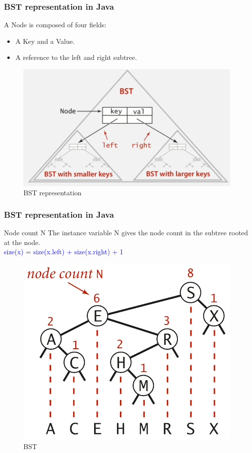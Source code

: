 \documentclass[11pt]{beamer}
\begin{document}
     \begin{frame}
    	\frametitle{BST representation in Java}
        \begin{block}{A Node is composed of four fields:}
        	\begin{itemize}
        		\item A Key and a Value.
        		\item A reference to the left and right subtree.
        	\end{itemize}
        \end{block}
       \begin{figure}
       	\centering
       	\includegraphics[width=0.8\linewidth]{"Screenshot 2020-11-02 at 10.21.59 AM"}
       	\caption{BST representation}
       	\label{fig:screenshot-2020-11-02-at-10}
       \end{figure}   
    \end{frame}
     
      \begin{frame}
     	\frametitle{BST representation in Java}
     	\begin{block}{Node count N}
     	The instance variable N gives the node count in the subtree rooted at the node.\\
     	\textcolor{blue}{size(x) = size(x.left) + size(x.right) + 1}
     	\end{block}
        \begin{figure}
        	\centering
        	\includegraphics[width=0.5\linewidth]{"Screenshot 2020-11-02 at 9.56.48 PM"}
        	\caption{BST}
        	\label{fig:screenshot-2020-11-02-at-9}
        \end{figure}
        
     \end{frame}
   
\end{document}
